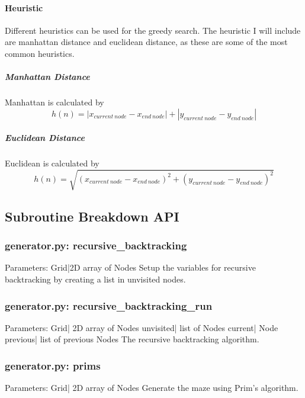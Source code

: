 \documentclass[titlepage]{article}
\begin{document}
\paragraph*{Heuristic}
Different heuristics can be used for the greedy search. The heuristic I will include are manhattan distance and euclidean distance, as these are some of the most common heuristics.

\subparagraph*{Manhattan Distance}
Manhattan is calculated by
\begin{equation}
    h(n) = |x_{current\ node} - x_{end\ node}| + |y_{current\ node} - y_{end\ node}|
\end{equation}
\subparagraph*{Euclidean Distance}
Euclidean is calculated by
\begin{equation}
    h(n) = \sqrt{(x_{current\ node} - x_{end\ node})^2 + (y_{current\ node} - y_{end\ node})^2}
\end{equation}

\subsection{Subroutine Breakdown API}
\subsubsection{generator.py: recursive\_backtracking}
Parameters:\newline
\indent Grid|2D array of Nodes\newline
Setup the variables for recursive backtracking by creating a list in unvisited nodes.

\subsubsection{generator.py: recursive\_backtracking\_run}
Parameters:\newline
\indent Grid| 2D array of Nodes\newline
\indent unvisited| list of Nodes\newline
\indent current| Node\newline
\indent previous| list of previous Nodes\newline
The recursive backtracking algorithm.

\subsubsection{generator.py: prims}
Parameters:\newline
\indent Grid| 2D array of Nodes\newline
Generate the maze using Prim's algorithm.
\end{document}

